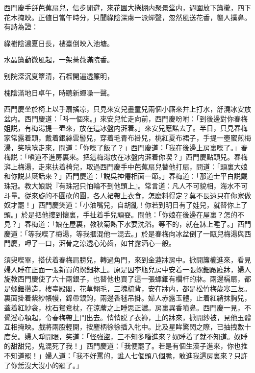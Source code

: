 西門慶手㧱芭蕉扇兒，信步閒遊，來花園大捲棚内聚景堂内，週圍放下簾櫳，四下花木掩映。正値日當午時分，只聞綠陰深䖏一派蟬聲，忽然風送花香，襲人撲鼻。有詩為證：

\begin{myquote}
綠樹陰濃夏日長，樓臺倒映入池塘。

水晶簾動微風起，一架薔薇滿院香。

别院深沉夏簟清，石榴開遍透簾明，

槐陰滿地日卓午，時聽新蟬噪一聲。
\end{myquote}

西門慶坐於椅上以手扇搖凉，只見來安兒畫童兒兩個小廝來井上打水，㧱澆冰安放盆内。西門慶道：「呌一個來。」來安兒忙走向前，西門慶吩咐：「到後邊對你春梅姐説，有梅湯提一壶來，放在這冰盤内湃着。」來安兒應諾去了。半日，只見春梅家常露着頭，戴着銀絲雲髻兒，穿着毛青布褂兒，桃紅夏布裙子，手提一壺蜜煎梅湯，笑嘻嘻走來，問道：「你喫了飯了？」西門慶道：「我在後邊上房裏喫了。」春梅説：「嗔道不進房裏來。把這梅湯放在冰盤内湃着你喫？」西門慶點頭兒。春梅湃上梅湯，走來扶着椅兒，取過西門慶手中芭蕉扇兒替他打扇，問道：「頭裏大娘和你説甚麽話來？」西門慶道：「説吳神僊相面一節。」春梅道：「那道士平白説戴珠冠。教大娘説『有珠冠只怕輪不到他頭上』。常言道：凡人不可貌相，海水不可斗量。従來旋的不圓砍的圓，各人裙帶上衣食，怎麽料得定？莫不長遠只在你家做奴才罷！」西門慶笑道：「小油嘴兒，自胡亂！你若到明日有了娃兒，就替你上了頭。」於是把他摟到懷裏，手扯着手兒頑耍。問他：「你娘在後邊在屋裏？怎的不見？」春梅道：「娘在屋裏，教秋菊熱下水要洗浴。等不的，就在牀上睡了。」西門慶道：「等我喫了梅湯，等我摑混他一混去。」於是春梅向冰盆倒了一甌兒梅湯與西門慶，呷了一口，湃骨之涼透心沁齒，如甘露洒心一般。

須臾喫畢，搭伏着春梅肩膀兒，轉過角門，來到金蓮牀房中。掀開簾櫳進來，看見婦人睡在正面一張新買的螺鈿牀上。原是因李瓶兒房中安着一張螺鈿厰廳牀，婦人旋教西門慶使了六十兩銀子，也替他也買了這一張螺鈿有欄杆的牀。兩邊槅扇，都是螺鈿攢造，樓臺殿閣，花草翎毛，三塊梳背，安在牀内，都是松竹梅歲寒三友。裏面掛着紫紗帳幔，錦帶銀鉤，兩邊香毬吊掛。婦人赤露玉體，止着紅綃抹胸兒，蓋着紅紗衾，枕石鴛鴦枕，在涼蓆之上睡思正濃。房裏異香噴鼻。西門慶一見，不覺淫心頓起，令春梅帶上門出去。悄悄脱了衣褲，上的牀來，掀開紗被，見他玉體互相掩映。戲將兩股輕開，按麈柄徐徐插入牝中。比及星眸驚閃之際，已抽拽數十度矣。婦人睜開眼，笑道：「怪強盜，三不知多喒進來？奴睡着了就不知道。奴睡的甜甜兒，鬼混死了我！」西門慶道：「我便罷了。若是有個生漢子進來，你也推不知道罷！」婦人道：「我不好罵的，誰人七個頭八個膽，敢進我這房裏來？只許了你恁沒大沒小的罷了。」


